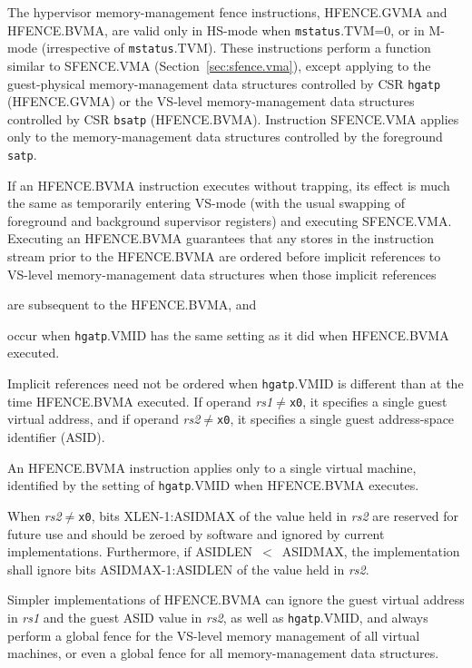The hypervisor memory-management fence instructions, HFENCE.GVMA and
HFENCE.BVMA, are valid only in HS-mode when {\tt mstatus}.TVM=0, or in M-mode
(irrespective of {\tt mstatus}.TVM).
These instructions perform a function similar to SFENCE.VMA
(Section~\ref{sec:sfence.vma}), except applying to the guest-physical
memory-management data structures controlled by CSR {\tt hgatp} (HFENCE.GVMA)
or the VS-level memory-management data structures controlled by CSR {\tt bsatp}
(HFENCE.BVMA).
Instruction SFENCE.VMA applies only to the memory-management data structures
controlled by the foreground {\tt satp}.

If an HFENCE.BVMA instruction executes without trapping, its effect is much the
same as temporarily entering VS-mode (with the usual swapping of foreground and
background supervisor registers) and executing SFENCE.VMA.
Executing an HFENCE.BVMA guarantees that any stores in the instruction stream
prior to the HFENCE.BVMA are ordered before implicit references to VS-level
memory-management data structures when those implicit references
\begin{compactitem}
\item
are subsequent to the HFENCE.BVMA, and
\item
occur when {\tt hgatp}.VMID has the same setting as it did when HFENCE.BVMA
executed.
\end{compactitem}
Implicit references need not be ordered when {\tt hgatp}.VMID is different than
at the time HFENCE.BVMA executed.
If operand {\em rs1}$\neq${\tt x0}, it specifies a single guest virtual
address, and if operand {\em rs2}$\neq${\tt x0}, it specifies a single guest
address-space identifier
(ASID).

\begin{commentary}
An HFENCE.BVMA instruction applies only to a single virtual machine, identified
by the setting of {\tt hgatp}.VMID when HFENCE.BVMA executes.
\end{commentary}

When {\em rs2}$\neq${\tt x0}, bits XLEN-1:ASIDMAX of the value held in {\em
rs2} are reserved for future use and should be zeroed by software and ignored
by current implementations.
Furthermore, if ASIDLEN~$<$~ASIDMAX, the implementation shall ignore bits
ASIDMAX-1:ASIDLEN of the value held in {\em rs2}.

\begin{commentary}
Simpler implementations of HFENCE.BVMA can ignore the guest virtual address in
{\em rs1} and the guest ASID value in {\em rs2}, as well as {\tt hgatp}.VMID,
and always perform a global fence for the VS-level memory management of all
virtual machines, or even a global fence for all memory-management data
structures.
\end{commentary}

